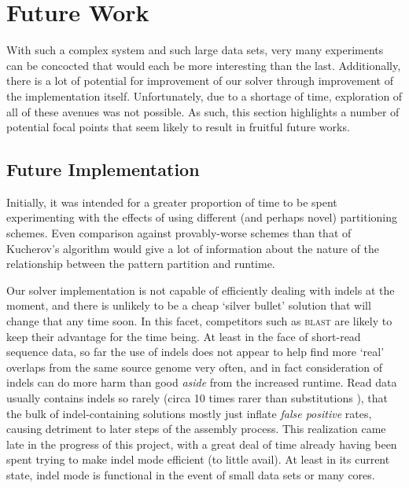 \chapter{Future Work}
With such a complex system and such large data sets, very many experiments can be concocted that would each be more interesting than the last. Additionally, there is a lot of potential for improvement of our solver through improvement of the implementation itself. Unfortunately, due to a shortage of time, exploration of all of these avenues was not possible. As such, this section highlights a number of potential focal points that seem likely to result in fruitful future works.

\section{Future Implementation}

Initially, it was intended for a greater proportion of time to be spent experimenting with the effects of using different (and perhaps novel) \glspl{partitioning scheme}. Even comparison against provably-worse schemes than that of Kucherov's algorithm would give a lot of information about the nature of the relationship between the \gls{pattern} partition and runtime.


Our \aspop{} solver implementation is not capable of efficiently dealing with \glspl{indel} at the moment, and there is unlikely to be a cheap `silver bullet' solution that will change that any time soon. In this facet, competitors such as \textsc{blast} are likely to keep their advantage for the time being. At least in the face of short-\gls{read} sequence data, so far the use of indels does not appear to help find more `real' overlaps from the same source genome very often, and in fact consideration of indels can do more harm than good \textit{aside} from the increased runtime. Read data usually contains indels so rarely (circa 10 times rarer than \glspl{substitution} \cite{err_rates}), that the bulk of indel-containing \glspl{solution} mostly just inflate \textit{false positive} rates, causing detriment to later steps of the assembly process. This realization came late in the progress of this project, with a great deal of time already having been spent trying to make indel mode efficient (to little avail). At least in its current state, indel mode is functional in the event of small data sets or many cores.


